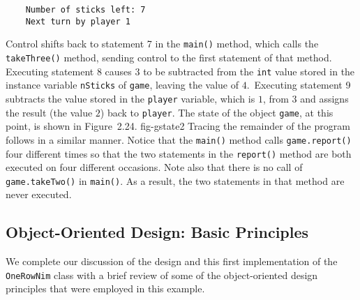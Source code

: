 \begin{jjjlisting}
\begin{lstlisting}
    Number of sticks left: 7
    Next turn by player 1
\end{lstlisting}
\end{jjjlisting}

\noindent Control shifts back to statement 7 in the {\tt main()} method, 
which calls the {\tt takeThree()} method, sending control to the first
statement of that method.  Executing statement 8 causes $3$ to be
subtracted from the {\tt int} value stored in the instance variable
{\tt nSticks} of {\tt game}, leaving the value of $4$.\ Executing
statement 9 subtracts the value stored in the {\tt player} variable,
which is $1$, from $3$ and assigns the result (the value $2$) back to
{\tt player}.  The state of the object {\tt game}, at this point, is
shown in Figure~2.24.
{fig-gstate2}
Tracing the remainder of the program follows in a similar manner.
Notice that the {\tt main()} method calls {\tt game.report()} four
different times so that the two statements in the {\tt report()}
method are both executed on four different occasions.  Note also that
there is no call of {\tt game.takeTwo()} in {\tt main()}. As a result,
the two statements in that method are never executed.

\subsection{Object-Oriented Design: Basic Principles}

\noindent We complete our discussion of the
design and this first implementation of the {\tt OneRowNim} class with
a brief review of some of the object-oriented design principles that
were employed in this example.

